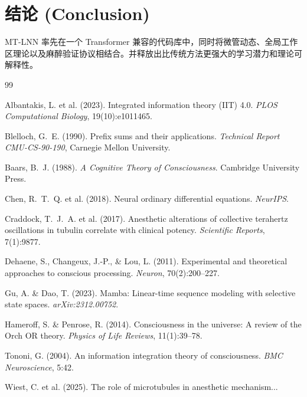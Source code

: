 \documentclass[11pt]{article}
\theoremstyle{definition}
\begin{document}
\section{结论 (Conclusion)}
\label{sec:conclusion}
MT-LNN 率先在一个 Transformer 兼容的代码库中，同时将微管动态、全局工作区理论以及麻醉验证协议相结合。并释放出比传统方法更强大的学习潜力和理论可解释性。


\begin{thebibliography}{99}

Albantakis, L. et al. (2023). Integrated information theory (IIT) 4.0. \textit{PLOS Computational Biology}, 19(10):e1011465.

Blelloch, G.~E. (1990). Prefix sums and their applications. \textit{Technical Report CMU-CS-90-190}, Carnegie Mellon University.

Baars, B.~J. (1988). \textit{A Cognitive Theory of Consciousness}. Cambridge University Press.

Chen, R.~T.~Q. et al. (2018). Neural ordinary differential equations. \textit{NeurIPS}.

Craddock, T.~J.~A. et al. (2017). Anesthetic alterations of collective terahertz oscillations in tubulin correlate with clinical potency. \textit{Scientific Reports}, 7(1):9877.

Dehaene, S., Changeux, J.-P., \& Lou, L. (2011). Experimental and theoretical approaches to conscious processing. \textit{Neuron}, 70(2):200--227.

Gu, A. \& Dao, T. (2023). Mamba: Linear-time sequence modeling with selective state spaces. \textit{arXiv:2312.00752}.

Hameroff, S. \& Penrose, R. (2014). Consciousness in the universe: A review of the Orch OR theory. \textit{Physics of Life Reviews}, 11(1):39--78.

Tononi, G. (2004). An information integration theory of consciousness. \textit{BMC Neuroscience}, 5:42.

Wiest, C. et al. (2025). The role of microtubules in anesthetic mechanism...
\end{thebibliography}
\end{document}
